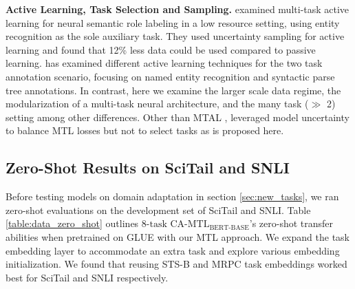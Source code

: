 \documentclass{article} \usepackage{iclr2021_conference,times}
\begin{document}
\textbf{Active Learning, Task Selection and Sampling.}
\citet{ikhwantri2018multi} examined multi-task active learning for neural semantic role labeling in a low resource setting, using entity recognition as the sole auxiliary task. They used uncertainty sampling for active learning and found that 12\% less data could be used compared to passive learning. 
\citet{reichart2008multi} has examined different active learning techniques for the two task annotation scenario, focusing on named entity recognition and syntactic parse tree annotations. 
In contrast, here we examine the larger scale data regime, the modularization of a multi-task neural architecture, and the many task ($\gg$ 2) setting among other differences. Other than MTAL \citep{reichart2008multi,ikhwantri2018multi}, \cite{DBLP:journals/corr/KendallGC17} leveraged model uncertainty to balance MTL losses but not to select tasks as is proposed here.










\subsection{Zero-Shot Results on SciTail and SNLI}
\label{append:newtask_embed_choice}
Before testing models on domain adaptation in section \ref{sec:new_tasks},  we ran zero-shot evaluations on the development set of SciTail and SNLI. Table \ref{table:data_zero_shot} outlines $\text{8-task CA-MTL}_{\text{BERT-BASE}}$'s zero-shot transfer abilities when  pretrained on GLUE with our MTL approach. We expand the task embedding layer to accommodate an extra task and explore various embedding initialization. We found that reusing STS-B and MRPC task embeddings worked best for SciTail and SNLI respectively.
\end{document}
